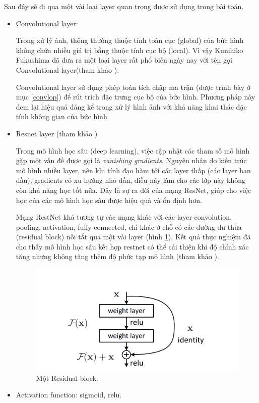 Sau đây sẽ đi qua một vài loại layer quan trọng được sử dụng trong bài toán.
\begin{itemize}
    \item Convolutional layer:

          Trong xử lý ảnh, thông thường thuộc tính toàn cục (global) của bức hình không chứa nhiều giá trị bằng thuộc tính cục bộ (local). Vì vậy Kunihiko Fukushima đã đưa ra một loại layer rất phổ biến ngày nay với tên gọi Convolutional  layer(tham khảo \cite{fukushima1988neocognitron}).

          Convolutional layer sử dụng phép toán tích chập ma trận (được trình bày ở mục \ref{convlop}) để rút trích đặc trưng cục bộ của bức hình. Phương pháp này đem lại hiệu quả đáng kể trong xử lý hình ảnh với khả năng khai thác đặc tính không gian của bức hình.

    \item Resnet layer (tham khảo \cite{he2016deep})

          Trong mô hình học sâu (deep learning), việc cập nhật các tham số mô hình gặp một vấn đề được gọi là \textit{vanishing gradients}. Nguyên nhân do kiến trúc mô hình nhiều layer, nên khi tính đạo hàm tới các layer thấp (các layer ban đầu), gradients có xu hướng nhỏ dần, điều này làm cho các lớp này không còn khả năng học tốt nữa. Đây là sự ra đời của mạng ResNet, giúp cho việc học của các mô hình học sâu được hiệu quả và ổn định hơn.

          Mạng RestNet khá tương tự các mạng khác với các layer convolution, pooling, activation, fully-connected, chỉ khác ở chỗ có các đường dư thừa (residual block) nối tắt qua một vài layer (hình \ref{fig:restnet}). Kết quả thực nghiệm đã cho thấy mô hình học sâu kết hợp restnet có thể cải thiện khi độ chính xác tăng nhưng không tăng thêm độ phức tạp mô hình (tham khảo \cite{he2016deep}).

          \begin{figure}[t]
              \begin{center}
                  \includegraphics[scale=0.2]{asset/image/restnet.png}
                  \caption{Một Residual block. }
                  \label{fig:restnet}
              \end{center}
          \end{figure}
    \item Activation function: sigmoid, relu.


\end{itemize}
